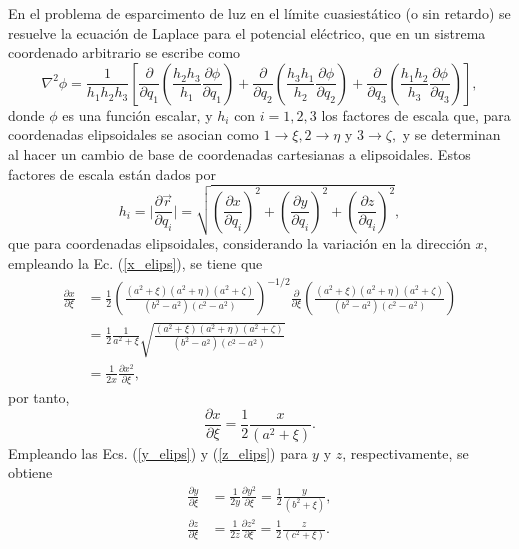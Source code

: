 En el problema de esparcimento de luz en el límite cuasiestático (o sin retardo) se resuelve la ecuación de Laplace para el potencial eléctrico, que  en un sistrema coordenado arbitrario se escribe como \cite{Arfken}
\begin{equation}
	\nabla^2\phi=\frac{1}{h_1h_2h_3}\left[\frac{\partial}{\partial q_1}\left(\frac{h_2h_3}{h_1}\frac{\partial\phi}{\partial q_1}\right)+\frac{\partial}{\partial q_2}\left(\frac{h_3h_1}{h_2}\frac{\partial\phi}{\partial q_2}\right)+\frac{\partial}{\partial q_3}\left(\frac{h_1h_2}{h_3}\frac{\partial\phi}{\partial q_3}\right)\right],
	\label{laplaciano}    
\end{equation}
donde $\phi$ es una función escalar, y  $h_i$ con $i=1,2,3$ los factores de escala que, para coordenadas elipsoidales se asocian como $1\rightarrow\xi, 2\rightarrow\eta$ y $3\rightarrow\zeta,$ y se determinan al hacer un cambio de base de coordenadas cartesianas a elipsoidales. Estos factores de escala están dados por \cite{Arfken}
\begin{equation}
	h_i=\Big|\frac{\partial \Vec{r}}{\partial q_i}\Big|=\sqrt{\left(\frac{\partial x}{\partial q_i}\right)^2+\left(\frac{\partial y}{\partial q_i}\right)^2+\left(\frac{\partial z}{\partial q_i}\right)^2},
\end{equation} 
que para coordenadas elipsoidales, considerando la variación en la dirección $x$, empleando la Ec. (\ref{x_elips}), se tiene que \begin{align*}
	\frac{\partial x}{\partial \xi}&=\frac{1}{2}\left(\frac{(a^2+\xi)(a^2+\eta)(a^2+\zeta)}{(b^2-a^2)(c^2-a^2)}\right)^{-1/2}\frac{\partial}{\partial \xi}\left(\frac{(a^2+\xi)(a^2+\eta)(a^2+\zeta)}{(b^2-a^2)(c^2-a^2)}\right)\nonumber\\
	&=\frac{1}{2}\frac{1}{a^2+\xi}\sqrt{\frac{(a^2+\xi)(a^2+\eta)(a^2+\zeta)}{(b^2-a^2)(c^2-a^2)}}\nonumber\\
	&=\frac{1}{2x}\frac{\partial x^2}{\partial\xi},
\end{align*}
por tanto,
\begin{equation*}
	\frac{\partial x}{\partial \xi}=\frac{1}{2}\frac{x}{(a^2+\xi)}.
\end{equation*}
Empleando las Ecs. (\ref{y_elips}) y (\ref{z_elips}) para $y$ y $z$, respectivamente, se obtiene
\begin{align*}
	\frac{\partial y}{\partial \xi}&=\frac{1}{2y}\frac{\partial y^2}{\partial\xi}=\frac{1}{2}\frac{y}{(b^2+\xi)},\\
	\frac{\partial z}{\partial \xi}&=\frac{1}{2z}\frac{\partial z^2}{\partial\xi}=\frac{1}{2}\frac{z}{(c^2+\xi)}.
\end{align*}
